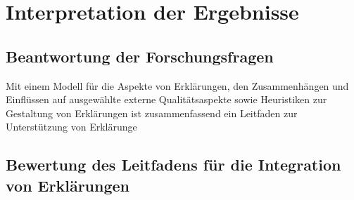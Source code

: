 \section{Interpretation der Ergebnisse}

\subsection*{Beantwortung der Forschungsfragen}

Mit einem Modell für die Aspekte von Erklärungen, den Zusammenhängen und Einflüssen auf ausgewählte externe Qualitätsaspekte sowie Heuristiken zur Gestaltung von Erklärungen ist zusammenfassend ein Leitfaden zur Unterstützung von Erklärunge

\subsection*{Bewertung des Leitfadens für die Integration von Erklärungen}